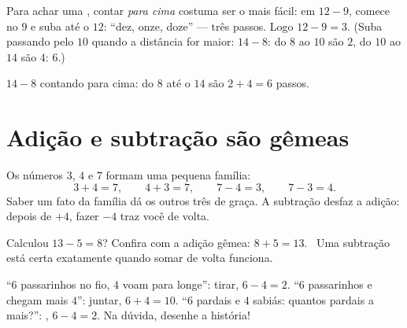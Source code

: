\begin{method}\label{met:g1:subtraction:countup}
Para achar uma , contar \emph{para cima} costuma ser o mais
fácil: em $12 - 9$, comece no $9$ e suba até o $12$: ``dez, onze,
doze'' --- três passos. Logo $12 - 9 = 3$. (Suba passando pelo $10$
quando a distância for maior: $14 - 8$: do $8$ ao $10$ são $2$, do
$10$ ao $14$ são $4$:  $6$.)
\end{method}

\begin{omfigure}

{\small $14 - 8$ contando para cima: do $8$ até o $14$ são
$2 + 4 = 6$ passos.}
\end{omfigure}

\section{Adição e subtração são gêmeas}

\begin{example}\label{ex:g1:subtraction:family}
Os números $3$, $4$ e $7$ formam uma pequena família:
\[
3 + 4 = 7, \qquad
4 + 3 = 7, \qquad
7 - 4 = 3, \qquad
7 - 3 = 4 .
\]
Saber um fato da família dá os outros três de graça. A subtração
desfaz a adição: depois de $+4$, fazer $-4$ traz você de volta.
\end{example}

\begin{example}[Conferir]\label{ex:g1:subtraction:check}
Calculou $13 - 5 = 8$? Confira com a adição gêmea: $8 + 5 = 13$.
\checkmark\ Uma subtração está certa exatamente quando somar de
volta funciona.
\end{example}

\begin{example}\label{ex:g1:subtraction:choose}
``$6$ passarinhos no fio, $4$ voam para longe'': tirar,
$6 - 4 = 2$. ``$6$ passarinhos e chegam mais $4$'': juntar,
$6 + 4 = 10$. ``$6$ pardais e $4$ sabiás: quantos pardais a mais?'':
, $6 - 4 = 2$. Na dúvida, desenhe a história!
\end{example}

